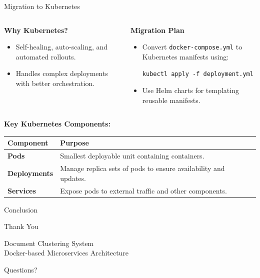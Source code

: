 \documentclass[notes]{beamer}
\begin{document}
{%
\begin{frame}{Migration to Kubernetes}

\begin{columns}[T]
    \begin{column}{0.5\textwidth}
        \textbf{Why Kubernetes?}
        \begin{itemize}
            \item Self-healing, auto-scaling, and automated rollouts.
            \item Handles complex deployments with better orchestration.
        \end{itemize}
    \end{column}
        \vspace{0.5cm}
    \begin{column}{0.5\textwidth}
        \textbf{Migration Plan}
        \begin{itemize}
            \item Convert \texttt{docker-compose.yml} to Kubernetes manifests using:
            \begin{scriptsize}
            \texttt{kubectl apply -f deployment.yml}
            \end{scriptsize}
            \item Use Helm charts for templating reusable manifests.
        \end{itemize}
    \end{column}
\end{columns}

\vspace{0.4cm}

\textbf{Key Kubernetes Components:}
\begin{center}
    \begin{tabular}{|p{3cm}|p{6cm}|}
        \hline
        \textbf{Component} & \textbf{Purpose} \\ \hline
        \textbf{Pods}       & Smallest deployable unit containing containers. \\ \hline
        \textbf{Deployments} & Manage replica sets of pods to ensure availability and updates. \\ \hline
        \textbf{Services}   & Expose pods to external traffic and other components. \\ \hline
    \end{tabular}
\end{center}
\end{frame}
}

\begin{frame}{Conclusion}
    \begin{center}
        \Large{Thank You}
        
        \vspace{0.5cm}
        \normalsize{Document Clustering System}\\
        Docker-based Microservices Architecture
        
        \vspace{0.5cm}
        Questions?
    \end{center}
\end{frame}
\end{document}
